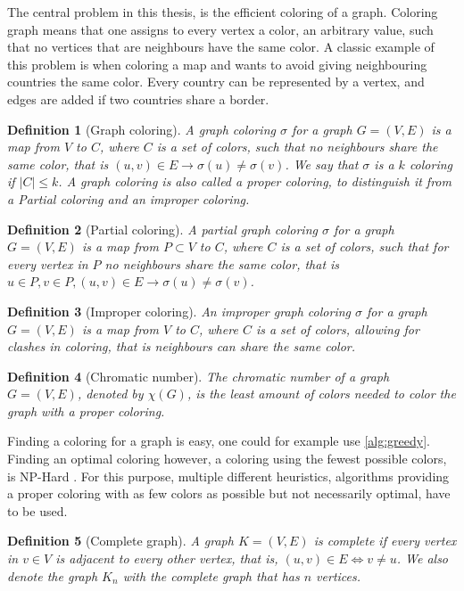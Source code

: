 \documentclass[a4paper]{article}
\newtheorem{definition}{Definition}[section]
\begin{document}
The central problem in this thesis, is the efficient coloring of a graph.
Coloring graph means that one assigns to every vertex a color, an arbitrary
value, such that no vertices that are neighbours have the same color. A classic
example of this problem is when coloring a map and wants to avoid giving
neighbouring countries the same color.  Every country can be represented by a
vertex, and edges are added if two countries share a border.

\begin{definition}[Graph coloring]
    A graph coloring $\sigma$ for a graph $G = (V,E)$ is a map from $V$ to $C$,
    where $C$ is a set of colors, such that no neighbours share the same color,
    that is $(u,v) \in E \to \sigma(u) \neq \sigma(v)$. We say that $\sigma$
    is a $k$ coloring if $|C| \leq k$. A graph coloring is also called a proper coloring,
    to distinguish it from a Partial coloring and an improper coloring.
\end{definition}
\begin{definition}[Partial coloring]{\cite{Constructive}}
    A partial graph coloring $\sigma$ for a graph $G = (V,E)$ is a map from $P \subset V$ to $C$,
    where $C$ is a set of colors, such that for every vertex in $P$ no neighbours 
    share the same color, that is $u \in P,v \in P, (u,v) \in E  \to \sigma(u) \neq \sigma(v)$.
\end{definition}
\begin{definition}[Improper coloring]{\cite{Constructive}}
    An improper graph coloring $\sigma$ for a graph $G = (V,E)$ is a map from
    $V$ to $C$, where $C$ is a set of colors, allowing for clashes in coloring,
    that is neighbours can share the same color.
\end{definition}
\begin{definition}[Chromatic number]
    The chromatic number of a graph $G = (V,E)$, denoted by $\chi(G)$, is the
    least amount of colors needed to color the graph with a proper coloring.
\end{definition}

Finding a coloring for a graph is easy, one could for example use
\autoref{alg:greedy}. Finding an optimal coloring however, a coloring using the
fewest possible colors, is NP-Hard \cite{NPHard}. For this purpose, multiple
different heuristics, algorithms providing a proper coloring with as few colors
as possible but not necessarily optimal, have to be used.

\begin{definition}[Complete graph]
    A graph $K = (V,E)$ is complete if every vertex in $v \in V$ is adjacent to
    every other vertex, that is, $ (u,v) \in E \iff v \neq u$. We also denote the graph $K_n$ with the complete graph that
    has $n$ vertices.
\end{definition}
\end{document}
